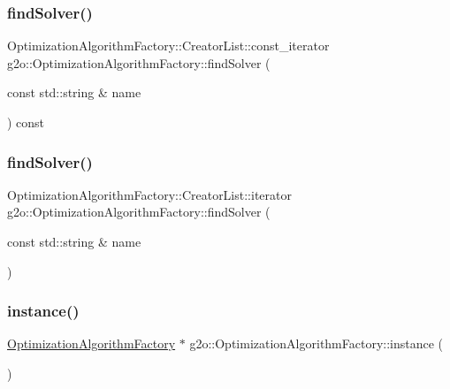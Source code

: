 \subsubsection{\texorpdfstring{find\+Solver()}{findSolver()}\hspace{0.1cm}{\footnotesize\ttfamily [1/2]}}
{\footnotesize\ttfamily Optimization\+Algorithm\+Factory\+::\+Creator\+List\+::const\+\_\+iterator g2o\+::\+Optimization\+Algorithm\+Factory\+::find\+Solver (\begin{DoxyParamCaption}\item[{const std\+::string \&}]{name }\end{DoxyParamCaption}) const\hspace{0.3cm}{\ttfamily [protected]}}

\mbox{\label{classg2o_1_1_optimization_algorithm_factory_a75857fd4977318d51412f4ebae20157d}} 
\subsubsection{\texorpdfstring{find\+Solver()}{findSolver()}\hspace{0.1cm}{\footnotesize\ttfamily [2/2]}}
{\footnotesize\ttfamily Optimization\+Algorithm\+Factory\+::\+Creator\+List\+::iterator g2o\+::\+Optimization\+Algorithm\+Factory\+::find\+Solver (\begin{DoxyParamCaption}\item[{const std\+::string \&}]{name }\end{DoxyParamCaption})\hspace{0.3cm}{\ttfamily [protected]}}

\mbox{\label{classg2o_1_1_optimization_algorithm_factory_a4fe827a82f01c74ef124e7a9a9c98707}} 
\subsubsection{\texorpdfstring{instance()}{instance()}}
{\footnotesize\ttfamily \mbox{\hyperlink{classg2o_1_1_optimization_algorithm_factory}{Optimization\+Algorithm\+Factory}} $\ast$ g2o\+::\+Optimization\+Algorithm\+Factory\+::instance (\begin{DoxyParamCaption}{ }\end{DoxyParamCaption})\hspace{0.3cm}{\ttfamily [static]}}



